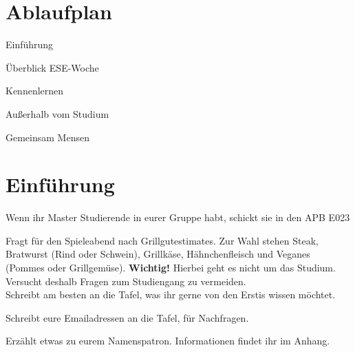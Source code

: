\documentclass[a4paper,12pt]{report}
\begin{document}
\section{Ablaufplan}
\begin{itemize*}
	\item Einführung
	\item Überblick ESE-Woche
	\item Kennenlernen
	\item Außerhalb vom Studium
	\item Gemeinsam Mensen
\end{itemize*}

\section{Einführung}
\begin{itemize*}
	\item Wenn ihr Master Studierende in eurer Gruppe habt, schickt sie in den APB E023
	\item Fragt für den Spieleabend nach Grillgutestimates. Zur Wahl stehen Steak, Bratwurst (Rind oder Schwein), Grillkäse, Hähnchenfleisch und Veganes (Pommes oder Grillgemüse). 
	\textbf{Wichtig!} Hierbei geht es nicht um das Studium. Versucht deshalb Fragen zum Studiengang zu vermeiden.\\
	Schreibt am besten an die Tafel, was ihr gerne von den Erstis wissen möchtet.
	\item Schreibt eure Emailadressen an die Tafel, für Nachfragen.
	\item Erzählt etwas zu eurem Namenspatron. Informationen findet ihr im Anhang.
\end{itemize*}
\end{document}
